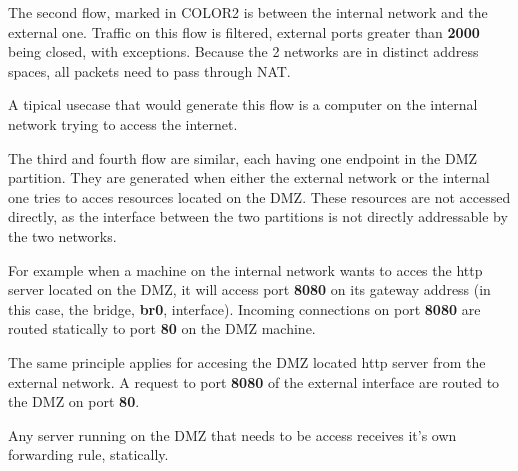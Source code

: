 The second flow, marked in COLOR2 is between the internal network and the
external one. Traffic on this flow is filtered, external ports greater
than \textbf{2000} being closed, with exceptions. Because the 2 networks
are in distinct address spaces, all packets need to pass through NAT.

A tipical usecase that would generate this flow is a computer on the internal
network trying to access the internet.

The third and fourth flow are similar, each having one endpoint in the DMZ
partition. They are generated when either the external network or the internal
one tries to acces resources located on the DMZ. These resources are not
accessed directly, as the interface between the two partitions is not
directly addressable by the two networks.

For example when a machine on the internal network wants to acces the http
server located on the DMZ, it will access port \textbf{8080}
on its gateway address (in this case, the bridge, \textbf{br0}, interface).
Incoming connections on port \textbf{8080} are routed statically to port
\textbf{80} on the DMZ machine.

The same principle applies for accesing the DMZ located http server from
the external network. A request to port \textbf{8080} of the external
interface are routed to the DMZ on port \textbf{80}.

Any server running on the DMZ that needs to be access receives it's own
forwarding rule, statically.
